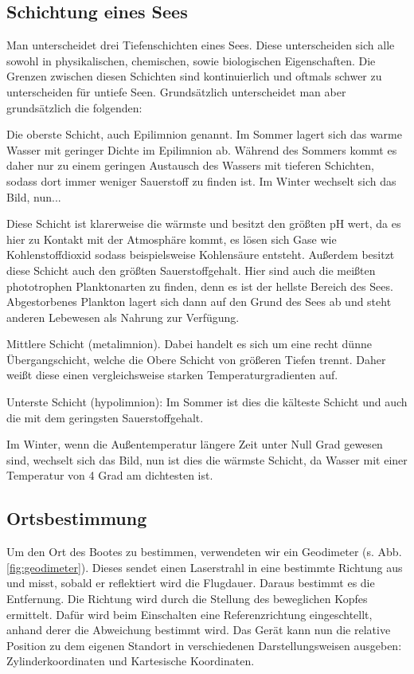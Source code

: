 \documentclass[12pt,a4paper,titlepage,headinclude,bibtotoc]{scrartcl}
\begin{document}
\subsection{Schichtung eines Sees}





Man unterscheidet drei Tiefenschichten eines Sees.
Diese unterscheiden sich alle sowohl in physikalischen, chemischen, sowie biologischen Eigenschaften. Die Grenzen zwischen diesen Schichten sind kontinuierlich und oftmals schwer zu unterscheiden für untiefe Seen.
Grundsätzlich unterscheidet man aber grundsätzlich die folgenden:

Die oberste Schicht, auch Epilimnion genannt. 
Im Sommer lagert sich das warme Wasser mit geringer Dichte im Epilimnion ab.
Während des Sommers kommt es daher nur zu einem geringen Austausch des Wassers
mit tieferen Schichten, sodass dort immer weniger Sauerstoff zu finden ist.
Im Winter wechselt sich das Bild, nun...



Diese Schicht ist klarerweise
die wärmste und besitzt den größten pH wert, da es hier zu Kontakt mit der Atmosphäre kommt, es lösen sich Gase wie Kohlenstoffdioxid sodass beispielsweise Kohlensäure entsteht. Außerdem besitzt diese Schicht auch den größten Sauerstoffgehalt. Hier sind auch die meißten phototrophen Planktonarten zu finden, denn es ist der hellste Bereich des Sees. Abgestorbenes Plankton lagert sich dann auf den Grund des Sees ab und steht anderen Lebewesen als Nahrung zur Verfügung.

Mittlere Schicht (metalimnion). Dabei handelt es sich um eine recht dünne  Übergangschicht, welche die Obere Schicht von größeren Tiefen trennt. Daher weißt diese einen vergleichsweise starken Temperaturgradienten auf.

Unterste Schicht (hypolimnion):
Im Sommer ist dies die kälteste Schicht und auch die mit dem geringsten Sauerstoffgehalt. 

Im Winter, wenn die Außentemperatur längere Zeit unter Null Grad gewesen sind, wechselt sich das Bild, nun ist dies die wärmste Schicht, da Wasser mit einer Temperatur von 4 Grad am dichtesten ist.

\subsection{Ortsbestimmung}
Um den Ort des Bootes zu bestimmen, verwendeten wir ein Geodimeter (s. Abb. \ref{fig:geodimeter}).
Dieses sendet einen Laserstrahl in eine bestimmte Richtung aus und misst, sobald er reflektiert wird die Flugdauer.
Daraus bestimmt es die Entfernung.
Die Richtung wird durch die Stellung des beweglichen Kopfes ermittelt.
Dafür wird beim Einschalten eine Referenzrichtung eingeschtellt, anhand derer die Abweichung bestimmt wird.
Das Gerät kann nun die relative Position zu dem eigenen Standort in verschiedenen Darstellungsweisen ausgeben: Zylinderkoordinaten und Kartesische Koordinaten.
\end{document}
